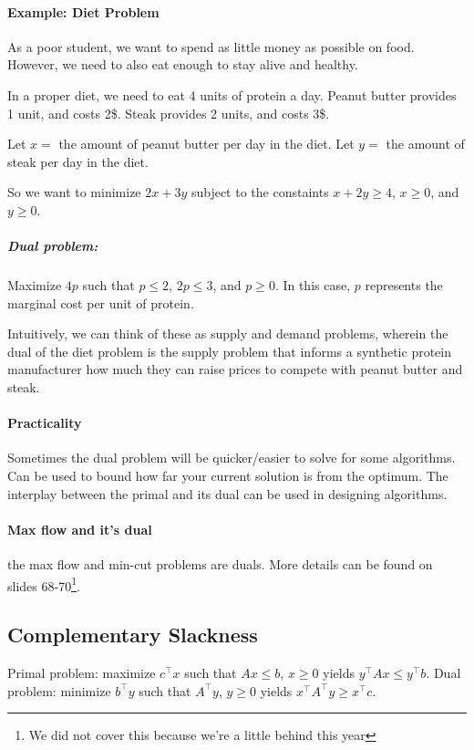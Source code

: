\documentclass[a4paper]{article}
\begin{document}
\paragraph{Example: Diet Problem}
As a poor student, we want to spend as little money as possible on food. However, we need to also eat enough to stay alive and healthy.

In a proper diet, we need to eat 4 units of protein a day. Peanut butter provides 1 unit, and costs 2\$. Steak provides 2 units, and costs 3\$.

Let $x=$ the amount of peanut butter per day in the diet.
Let $y=$ the amount of steak per day in the diet.

So we want to minimize $2x+3y$ subject to the constaints $x+2y \ge 4$, $x \ge 0$, and $y \ge 0$.

\subparagraph{Dual problem:}
Maximize $4p$ such that $p \le 2$, $2p \le 3$, and $p \ge 0$.
In this case, $p$ represents the marginal cost per unit of protein.

Intuitively, we can think of these as supply and demand problems, wherein the dual of the diet problem is the supply problem that informs a synthetic protein manufacturer how much they can raise prices to compete with peanut butter and steak.

\paragraph{Practicality}
Sometimes the dual problem will be quicker/easier to solve for some algorithms.
Can be used to bound how far your current solution is from the optimum.
The interplay between the primal and its dual can be used in designing algorithms.

\paragraph{Max flow and it's dual}
the max flow and min-cut problems are duals. More details can be found on slides 68-70\footnote{We did not cover this because we're a little behind this year}.

\subsection{Complementary Slackness}
Primal problem: maximize $c^\intercal x$ such that $Ax \le b$, $x \ge 0$ yields $y^\intercal Ax \le y^\intercal b$.
Dual problem: minimize $b^\intercal y$ such that $A^\intercal y$, $y \ge 0$ yields $x^\intercal A^\intercal y \ge x^\intercal c $.
\end{document}
